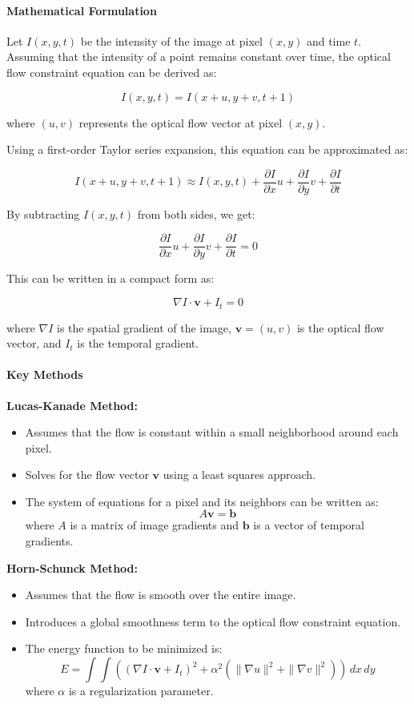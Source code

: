 \documentclass[12pt]{article}
\begin{document}
\paragraph{Mathematical Formulation}

Let \( I(x, y, t) \) be the intensity of the image at pixel \((x, y)\) and time \( t \). Assuming that the intensity of a point remains constant over time, the optical flow constraint equation can be derived as:

\[
I(x, y, t) = I(x + u, y + v, t + 1)
\]

where \( (u, v) \) represents the optical flow vector at pixel \((x, y)\).

Using a first-order Taylor series expansion, this equation can be approximated as:

\[
I(x + u, y + v, t + 1) \approx I(x, y, t) + \frac{\partial I}{\partial x} u + \frac{\partial I}{\partial y} v + \frac{\partial I}{\partial t}
\]

By subtracting \( I(x, y, t) \) from both sides, we get:

\[
\frac{\partial I}{\partial x} u + \frac{\partial I}{\partial y} v + \frac{\partial I}{\partial t} = 0
\]

This can be written in a compact form as:

\[
\nabla I \cdot \mathbf{v} + I_t = 0
\]

where \( \nabla I \) is the spatial gradient of the image, \( \mathbf{v} = (u, v) \) is the optical flow vector, and \( I_t \) is the temporal gradient.

\paragraph{Key Methods}

\textbf{Lucas-Kanade Method:}
\begin{itemize}
    \item Assumes that the flow is constant within a small neighborhood around each pixel.
    \item Solves for the flow vector \( \mathbf{v} \) using a least squares approach.
    \item The system of equations for a pixel and its neighbors can be written as:
    \[
    A \mathbf{v} = \mathbf{b}
    \]
    where \( A \) is a matrix of image gradients and \( \mathbf{b} \) is a vector of temporal gradients.
\end{itemize}

\textbf{Horn-Schunck Method:}
\begin{itemize}
    \item Assumes that the flow is smooth over the entire image.
    \item Introduces a global smoothness term to the optical flow constraint equation.
    \item The energy function to be minimized is:
    \[
    E = \int \int \left( (\nabla I \cdot \mathbf{v} + I_t)^2 + \alpha^2 (\|\nabla u\|^2 + \|\nabla v\|^2) \right) \, dx \, dy
    \]
    where \( \alpha \) is a regularization parameter.
\end{itemize}
\end{document}

